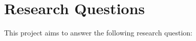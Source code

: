 \section{Research Questions}\label{section:research_questions}

This project aims to answer the following research question:\\

